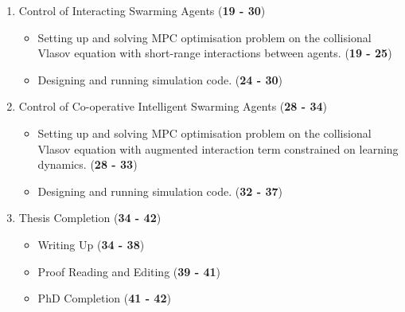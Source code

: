 \documentclass[.../main.tex]{subfiles}
\begin{document}
\begin{enumerate}
		\item Control of Interacting Swarming Agents (\textbf{19 - 30})
		\begin{itemize}
			\item Setting up and solving MPC optimisation problem on the collisional Vlasov
			equation with short-range interactions between agents. (\textbf{19 - 25})
			\item Designing and running simulation code. (\textbf{24 - 30})
		\end{itemize}

		\item Control of Co-operative Intelligent Swarming Agents (\textbf{28 - 34})
		\begin{itemize}
			\item Setting up and solving MPC optimisation problem on the collisional Vlasov
			equation with augmented interaction term constrained on learning dynamics. (\textbf{28 -
			33})
			\item Designing and running simulation code. (\textbf{32 - 37})
		\end{itemize}



		\item Thesis Completion (\textbf{34 - 42})
		\begin{itemize}
			\item Writing Up (\textbf{34 - 38})
			\item Proof Reading and Editing (\textbf{39 - 41})
			\item PhD Completion (\textbf{41 - 42})
		\end{itemize}

	\end{enumerate}
\end{document}

